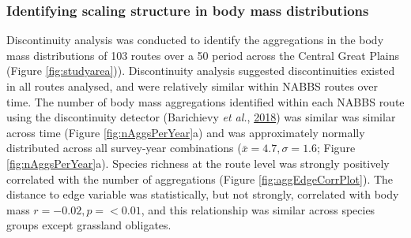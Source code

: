 \documentclass[12pt,twoside,openany]{reedthesis}
\begin{document}
\hypertarget{identifying-scaling-structure-in-body-mass-distributions}{%
\subsubsection{Identifying scaling structure in body mass distributions}\label{identifying-scaling-structure-in-body-mass-distributions}}

Discontinuity analysis was conducted to identify the aggregations in the body mass distributions of 103 routes over a 50 period across the Central Great Plains (Figure \ref{fig:studyarea})). Discontinuity analysis suggested discontinuities existed in all routes analysed, and were relatively similar within NABBS routes over time. The number of body mass aggregations identified within each NABBS route using the discontinuity detector (Barichievy \emph{et al.}, \protect\hyperlink{ref-barichievy2018method}{2018}) was similar was similar across time (Figure \ref{fig:nAggsPerYear}a) and was approximately normally distributed across all survey-year combinations (\(\bar{x} = 4.7, \sigma = 1.6\); Figure \ref{fig:nAggsPerYear}a). Species richness at the route level was strongly positively correlated with the number of aggregations (Figure \ref{fig:aggEdgeCorrPlot}). The distance to edge variable was statistically, but not strongly, correlated with body mass \(r=-0.02, p = <0.01\), and this relationship was similar across species groups except grassland obligates.
\end{document}
